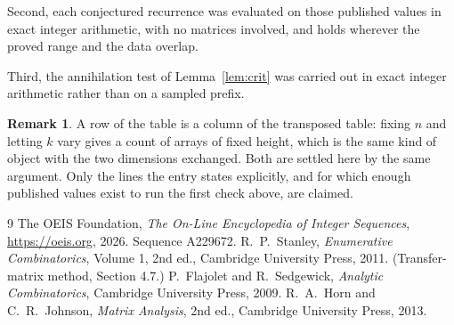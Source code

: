 \documentclass[11pt,a4paper]{article}
\theoremstyle{plain}
\theoremstyle{definition}
\newtheorem{remark}[theorem]{Remark}
\begin{document}
Second, each conjectured recurrence was evaluated on those published values in exact
integer arithmetic, with no matrices involved, and holds wherever the proved range and the
data overlap.

Third, the annihilation test of Lemma~\ref{lem:crit} was carried out in exact integer
arithmetic rather than on a sampled prefix.

\begin{remark}
A row of the table is a column of the transposed table: fixing $n$ and letting $k$ vary gives a
count of arrays of fixed height, which is the same kind of object with the two dimensions
exchanged. Both are settled here by the same argument. Only the lines the entry states
explicitly, and for which enough published values exist to run the first check above, are
claimed.
\end{remark}

\begin{thebibliography}{9}
 The OEIS Foundation, \emph{The On-Line Encyclopedia of Integer
Sequences}, \url{https://oeis.org}, 2026. Sequence A229672.
 R.~P.~Stanley, \emph{Enumerative Combinatorics}, Volume 1, 2nd ed.,
Cambridge University Press, 2011. (Transfer-matrix method, Section 4.7.)
 P.~Flajolet and R.~Sedgewick, \emph{Analytic Combinatorics}, Cambridge
University Press, 2009.
 R.~A.~Horn and C.~R.~Johnson, \emph{Matrix Analysis}, 2nd ed., Cambridge
University Press, 2013.
\end{thebibliography}
\end{document}
